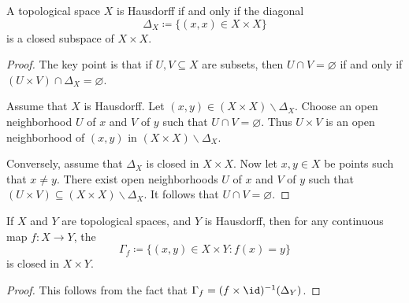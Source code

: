 \begin{prp}
	A topological space $X$ is Hausdorff if and only if the diagonal
	\begin{equation*}
		\Delta_X \coloneq \{ (x,x)\in X\times X \}
	\end{equation*}
	is a closed subspace of $X\times X$.
\end{prp}

\begin{proof}
	The key point is that if $U,V \subseteq X$ are subsets, then $U \cap V = \varnothing$ if and only if $(U \times V) \cap \Delta_X = \varnothing$.

	Assume that $X$ is Hausdorff.
	Let $(x,y) \in (X \times X) \smallsetminus \Delta_X$.
	Choose an open neighborhood $U$ of $x$ and $V$ of $y$ such that $U \cap V = \varnothing$.
	Thus $U \times V$ is an open neighborhood of $(x,y)$ in $(X \times X) \smallsetminus \Delta_X$.

	Conversely, assume that $\Delta_X$ is closed in $X \times X$.
	Now let $x, y \in X$ be points such that $x \neq y$.
	There exist open neighborhoods $U$ of $x$ and $V$ of $y$ such that $(U \times V) \subseteq (X \times X) \smallsetminus \Delta_X$.
	It follows that $U \cap V = \varnothing$.
\end{proof}

\begin{cor}
	If $X$ and $Y$ are topological spaces, and $Y$ is Hausdorff, then for any continuous map $f\colon X \to Y$, the 
	\begin{equation*}
		\Gamma_f \coloneq \{ (x,y) \in X\times Y : f(x)=y \}
	\end{equation*}
	is closed in $X\times Y$.
\end{cor}

\begin{proof}
	This follows from the fact that $\Gamma_f = (f \times \id)^{-1}(\Delta_Y)$.
\end{proof}

